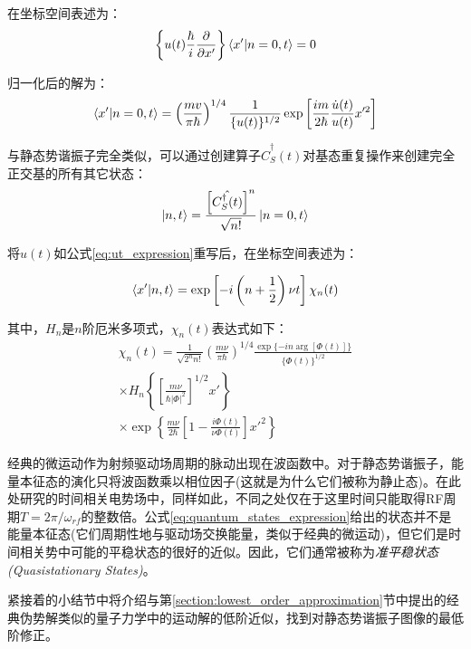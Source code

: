 在坐标空间表述为：
\begin{align}
    \left\{u(t)\frac{\hbar}{i}\frac{\partial}{\partial x'}\right\}\braket{x'|n=0,t}=0
\end{align}

归一化后的解为：
\begin{align}
    \braket{x'|n=0,t}=\left(\frac{mv}{\pi\hbar}\right)^{1/4}\frac{1}{\{u(t)\}^{1/2}}\exp\left[\frac{i m}{2\hbar}\frac{\dot{u}(t)}{u(t)}x'^2\right]
\end{align}

与静态势谐振子完全类似，可以通过创建算子$\hat{C}_S^\dagger(t)$对基态重复操作来创建完全正交基的所有其它状态：
\begin{align}
    \ket{n,t}=\frac{\left[\hat{C_S^\dagger(t)}\right]^n}{\sqrt{n!}}\ket{n=0,t}\label{eq:basic_sattes}
\end{align}

将$u(t)$如公式\eqref{eq:ut_expression}重写后，在坐标空间表述为：

\begin{align}
    \braket{x'|n,t}=\exp\left[-i\left(n+\frac{1}{2}\right)\nu t\right]\chi_n(t) \label{eq:quantum_states_expression}
\end{align}

其中，$H_n$是$n$阶厄米多项式，$\chi_n(t)$表达式如下：
\begin{align}
    \chi_n(t)=\frac{1}{\sqrt{2^n n!}}\left(\frac{m\nu}{\pi  \hbar}\right)^{1/4}
    \frac{\exp\{-i n \arg\left[\Phi(t)\right]\}}{\{\Phi(t)\}^{1/2}}\\
    \times H_n\left\{\left[\frac{m\nu}{\hbar|\Phi|^2}\right]^{1/2}x'\right\}\\
    \times \exp\left\{\frac{m\nu }{2\hbar}\left[1-\frac{i\Phi(t)}{\nu\Phi(t)}\right]x'^2\right\}
\end{align}

经典的微运动作为射频驱动场周期的脉动出现在波函数中。对于静态势谐振子，能量本征态的演化只将波函数乘以相位因子(这就是为什么它们被称为静止态)。在此处研究的时间相关电势场中，同样如此，不同之处仅在于这里时间只能取得RF周期$T=2\pi/\omega_{rf}$的整数倍。公式\ref{eq:quantum_states_expression}给出的状态并不是能量本征态(它们周期性地与驱动场交换能量，类似于经典的微运动)，但它们是时间相关势中可能的平稳状态的很好的近似。因此，它们通常被称为\emph{准平稳状态(Quasistationary States)}。

紧接着的小结节中将介绍与第\ref{section:lowest_order_approximation}节中提出的经典伪势解类似的量子力学中的运动解的低阶近似，找到对静态势谐振子图像的最低阶修正。



